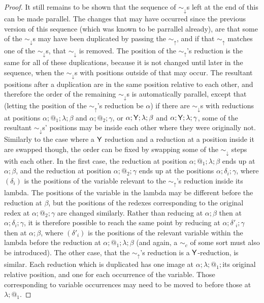 \begin{proof}
  It still remains to be shown that the sequence of $\sim_\downarrow$s left at the end of this can be made parallel. The changes that may have occurred since the previous version of this sequence (which was known to be parrallel already), are that some of the $\sim_\downarrow$s may have been duplicated by passing the $\sim_\uparrow$, and if that $\sim_\uparrow$ matches one of the $\sim_\downarrow$s, that $\sim_\downarrow$ is removed. The position of the $\sim_\uparrow$'s reduction is the same for all of these duplications, because it is not changed until later in the sequence, when the $\sim_\downarrow$s with positions outside of that may occur. The resultant positions after a duplication are in the same position relative to each other, and therefore the order of the remaining $\sim_\downarrow$s is automatically parallel, except that (letting the position of the $\sim_\uparrow$'s reduction be $\alpha$) if there are $\sim_\downarrow$s with reductions at positions $\alpha;@_1;\lambda;\beta$ and $\alpha;@_2;\gamma$, or $\alpha;\mathsf{Y};\lambda;\beta$ and $\alpha;\mathsf{Y};\lambda;\gamma$, some of the resultant $\sim_\downarrow$s' positions may be inside each other where they were originally not. Similarly to the case where a $\mathsf{Y}$ reduction and a reduction at a position inside it are swapped though, the order can be fixed by swapping some of the $\sim_\downarrow$ steps with each other. In the first case, the reduction at position $\alpha;@_1;\lambda;\beta$ ends up at $\alpha;\beta$, and the reduction at position $\alpha;@_2;\gamma$ ends up at the positions $\alpha;\delta_i;\gamma$, where $(\delta_i)$ is the positions of the variable relevant to the $\sim_\uparrow$'s reduction inside its lambda. The positions of the variable in the lambda may be different before the reduction at $\beta$, but the positions of the redexes corresponding to the original redex at $\alpha;@_2;\gamma$ are changed similarly. Rather than reducing at $\alpha;\beta$ then at $\alpha;\delta_i;\gamma$, it is therefore possible to reach the same point by reducing at $\alpha;\delta'_i;\gamma$ then at $\alpha;\beta$, where $(\delta'_i)$ is the positions of the relevant variable within the lambda before the reduction at $\alpha;@_1;\lambda;\beta$ (and again, a $\sim_c$ of some sort must also be introduced). The other case, that the $\sim_\uparrow$'s reduction is a $\mathsf{Y}$-reduction, is similar. Each reduction which is duplicated has one image at $\alpha;\lambda;@_1;$its original relative position, and one for each occurrence of the variable. Those corresponding to variable occurrences may need to be moved to before those at $\lambda;@_1$.


\end{proof}
